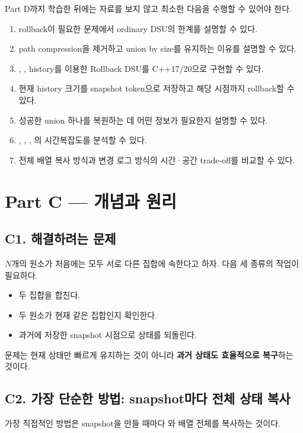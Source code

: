 Part D까지 학습한 뒤에는 자료를 보지 않고 최소한 다음을 수행할 수 있어야 한다.
\begin{enumerate}
\item rollback이 필요한 문제에서 ordinary DSU의 한계를 설명할 수 있다.
\item path compression을 제거하고 union by size를 유지하는 이유를 설명할 수 있다.
\item {}, , history를 이용한 Rollback DSU를 C++17/20으로 구현할 수 있다.
\item 현재 history 크기를 snapshot token으로 저장하고 해당 시점까지 rollback할 수 있다.
\item 성공한 union 하나를 복원하는 데 어떤 정보가 필요한지 설명할 수 있다.
\item {}, , , 의 시간복잡도를 분석할 수 있다.
\item 전체 배열 복사 방식과 변경 로그 방식의 시간·공간 trade-off를 비교할 수 있다.
\end{enumerate}

\section{Part C --- 개념과 원리}

\subsection{C1. 해결하려는 문제}
$N$개의 원소가 처음에는 모두 서로 다른 집합에 속한다고 하자. 다음 세 종류의 작업이 필요하다.
\begin{itemize}
\item 두 집합을 합친다.
\item 두 원소가 현재 같은 집합인지 확인한다.
\item 과거에 저장한 snapshot 시점으로 상태를 되돌린다.
\end{itemize}

문제는 현재 상태만 빠르게 유지하는 것이 아니라 \textbf{과거 상태도 효율적으로 복구}하는 것이다.

\subsection{C2. 가장 단순한 방법: snapshot마다 전체 상태 복사}
가장 직접적인 방법은 snapshot을 만들 때마다 와  배열 전체를 복사하는 것이다.

